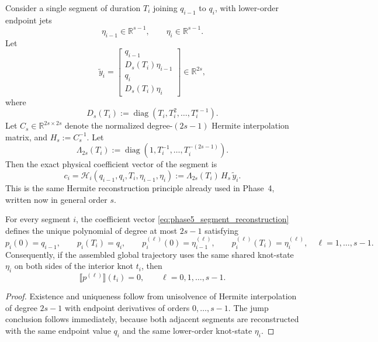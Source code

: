 Consider a single segment of duration \(T_i\) joining \(q_{i-1}\) to \(q_i\), with lower-order endpoint jets
\[
\eta_{i-1}\in\mathbb R^{s-1},
\qquad
\eta_i\in\mathbb R^{s-1}.
\]
Let
\[
\widetilde y_i
=
\begin{bmatrix}
q_{i-1}\\
D_s(T_i)\eta_{i-1}\\
q_i\\
D_s(T_i)\eta_i
\end{bmatrix}
\in\mathbb R^{2s},
\]
where
\begin{equation}
\label{eq:phase5_Ds}
D_s(T_i):=\operatorname{diag}(T_i,T_i^2,\dots,T_i^{s-1}).
\end{equation}
Let \(C_s\in\mathbb R^{2s\times 2s}\) denote the normalized degree-\((2s-1)\) Hermite interpolation matrix, and \(H_s:=C_s^{-1}\).
Let
\begin{equation}
\label{eq:phase5_lambda_2s}
\Lambda_{2s}(T_i):=\operatorname{diag}(1,T_i^{-1},\dots,T_i^{-(2s-1)}).
\end{equation}
Then the exact physical coefficient vector of the segment is
\begin{equation}
\label{eq:phase5_segment_reconstruction}
c_i
=
\mathcal H_i(q_{i-1},q_i,T_i,\eta_{i-1},\eta_i)
:=
\Lambda_{2s}(T_i)\,H_s\,\widetilde y_i.
\end{equation}
This is the same Hermite reconstruction principle already used in Phase~4, written now in general order \(s\).

\begin{proposition}
\label{prop:phase5_basic_hermite}
For every segment \(i\), the coefficient vector \eqref{eq:phase5_segment_reconstruction} defines the unique polynomial of degree at most \(2s-1\) satisfying
\[
p_i(0)=q_{i-1},\qquad p_i(T_i)=q_i,
\qquad
p_i^{(\ell)}(0)=\eta_{i-1}^{(\ell)},
\qquad
p_i^{(\ell)}(T_i)=\eta_i^{(\ell)},
\quad \ell=1,\dots,s-1.
\]
Consequently, if the assembled global trajectory uses the same shared knot-state \(\eta_i\) on both sides of the interior knot \(t_i\), then
\[
\llbracket p^{(\ell)}\rrbracket(t_i)=0,
\qquad \ell=0,1,\dots,s-1.
\]
\end{proposition}

\begin{proof}
Existence and uniqueness follow from unisolvence of Hermite interpolation of degree \(2s-1\) with endpoint derivatives of orders \(0,\dots,s-1\).
The jump conclusion follows immediately, because both adjacent segments are reconstructed with the same endpoint value \(q_i\) and the same lower-order knot-state \(\eta_i\).
\end{proof}

